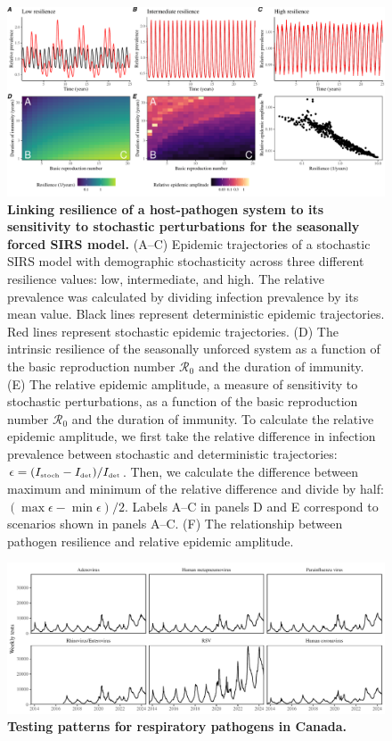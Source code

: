 \documentclass[12pt]{article}
\newcommand{\tsub}[2]{#1_{{\textrm{\tiny #2}}}}
\begin{document}
\begin{figure}[!th]
\begin{center}
\includegraphics[width=\textwidth]{../figure6/figure_persistence_noise_cycle.pdf}
\caption{
\textbf{Linking resilience of a host-pathogen system to its sensitivity to stochastic perturbations for the seasonally forced SIRS model.}
(A--C) Epidemic trajectories of a stochastic SIRS model with demographic stochasticity across three different resilience values: low, intermediate, and high.
The relative prevalence was calculated by dividing infection prevalence by its mean value.
Black lines represent deterministic epidemic trajectories.
Red lines represent stochastic epidemic trajectories.
(D) The intrinsic resilience of the seasonally unforced system as a function of the basic reproduction number $\mathcal R_0$ and the duration of immunity.
(E) The relative epidemic amplitude, a measure of sensitivity to stochastic perturbations, as a function of the basic reproduction number $\mathcal R_0$ and the duration of immunity.
To calculate the relative epidemic amplitude, we first take the relative difference in infection prevalence between stochastic and deterministic trajectories: $\epsilon = (\tsub{I}{stoch}-\tsub{I}{det})/\tsub{I}{det}$. 
Then, we calculate the difference between maximum and minimum of the relative difference and divide by half: $(\max \epsilon - \min \epsilon)/2$.
Labels A--C in panels D and E correspond to scenarios shown in panels A--C.
(F) The relationship between pathogen resilience and relative epidemic amplitude.
}
\end{center}
\end{figure}

\pagebreak

\begin{figure}[!th]
\begin{center}
\includegraphics[width=\textwidth]{../figure_test/figure_test_canada.pdf}
\caption{
\textbf{Testing patterns for respiratory pathogens in Canada.}
}
\end{center}
\end{figure}
\end{document}
